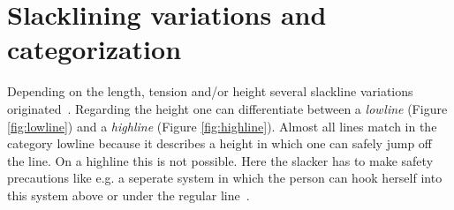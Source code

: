 \section{Slacklining variations and categorization}\label{3_2_slacklineVariations}
Depending on the length, tension and/or height several slackline variations originated~\cite{MillerMauser2013-sl, Kleindl2011-bl, Thomann2017-ab}. Regarding the height one can differentiate between a \textit{lowline} (Figure \ref{fig:lowline}) and a \textit{highline} (Figure \ref{fig:highline}). Almost all lines match in the category lowline because it describes a height in which one can safely jump off the line. On a highline this is not possible. Here the slacker has to make safety precautions like e.g. a seperate system in which the person can hook herself into this system above or under the regular line~\cite{Kleindl2011-bl}.
